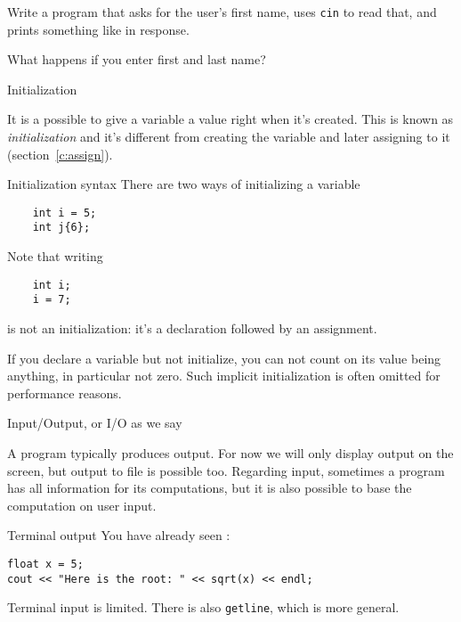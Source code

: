 \begin{exercise}
  \label{ex:ask-for-name}
  Write a program that asks for the user's first name, uses
  \lstinline{cin} to read that, and prints
  something like  in response.

  What happens if you enter first and last name?
\end{exercise}

 {Initialization}

It is a possible to give a variable a value right when it's
created. This is known as
\emph{initialization} and it's
different from creating the variable and later assigning to it
(section~\ref{c:assign}).

\begin{block}{Initialization syntax}
  \label{sl:init-var}
  There are two ways of initializing a variable
  \begin{lstlisting}
    int i = 5;
    int j{6};
  \end{lstlisting}
  Note that writing 
  \begin{lstlisting}
    int i;
    i = 7;
  \end{lstlisting}
  is not an initialization: it's a declaration followed by an
  assignment.

  If you declare a variable but not initialize, you can not count on
  its value being anything, in particular not zero. Such implicit initialization is
  often omitted for performance reasons.
\end{block}

 {Input/Output, or I/O as we say}
\label{sec:io}

A program typically produces output. For now we will only display
output on the screen, but output to file is possible too.  Regarding
input, sometimes a program has all information for its computations,
but it is also possible to base the computation on user input.

\begin{block}{Terminal output}
  \label{sl:cout}
You have already seen :
\begin{lstlisting}
float x = 5;
cout << "Here is the root: " << sqrt(x) << endl;
\end{lstlisting}
\end{block}

\begin{block}{Terminal input}
  \label{sl:cin-more}
   is limited.
  There is also \lstinline{getline}, which is more general.
\end{block}

